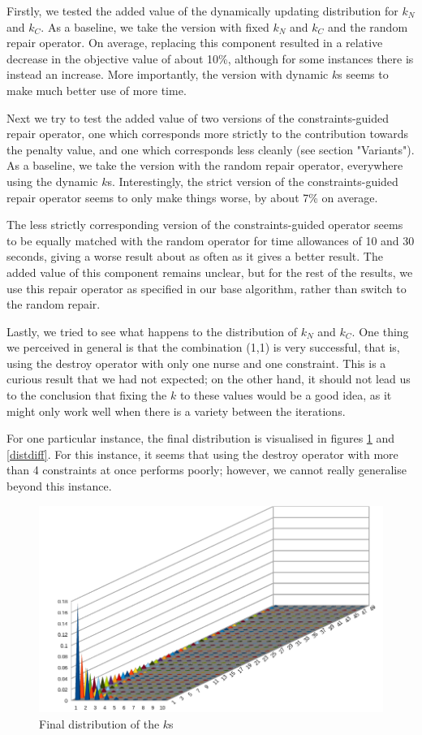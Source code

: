 \documentclass{article}
\begin{document}
Firstly, we tested the added value of the dynamically updating distribution for $k_N$ and $k_C$.
As a baseline, we take the version with fixed $k_N$ and $k_C$ and the random repair operator.
On average, replacing this component resulted in a relative decrease in the objective value of about 10\%, although for some instances there is instead an increase.
More importantly, the version with dynamic $k$s seems to make much better use of more time.

Next we try to test the added value of two versions of the constraints-guided repair operator, one which corresponds more strictly to the contribution towards the penalty value, and one which corresponds less cleanly (see section "Variants").
As a baseline, we take the version with the random repair operator, everywhere using the dynamic $k$s.
Interestingly, the strict version of the constraints-guided repair operator seems to only make things worse, by about 7\% on average.

The less strictly corresponding version of the constraints-guided operator seems to be equally matched with the random operator for time allowances of 10 and 30 seconds, giving a worse result about as often as it gives a better result.
The added value of this component remains unclear, but for the rest of the results, we use this repair operator as specified in our base algorithm, rather than switch to the random repair.


Lastly, we tried to see what happens to the distribution of $k_N$ and $k_C$.
One thing we perceived in general is that the combination (1,1) is very successful, that is, using the destroy operator with only one nurse and one constraint.
This is a curious result that we had not expected; on the other hand, it should not lead us to the conclusion that fixing the $k$ to these values would be a good idea, as it might only work well when there is a variety between the iterations.

For one particular instance, the final distribution is visualised in figures \ref{finaldist} and \ref{distdiff}.
For this instance, it seems that using the destroy operator with more than 4 constraints at once performs poorly; however, we cannot really generalise beyond this instance.

\begin{figure}
	\includegraphics[width=\linewidth]{"kdist.png"}
	\caption{Final distribution of the $k$s}
	\label{finaldist}
\end{figure}
\end{document}
